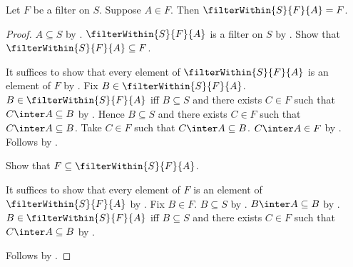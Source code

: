 \begin{proposition}\label{filter_within_eventual_set}
    Let $F$ be a filter on $S$.
    Suppose $A\in F$.
    Then $\filterWithin{S}{F}{A}=F$.
\end{proposition}
\begin{proof}
    $A\subseteq S$ by .
    $\filterWithin{S}{F}{A}$ is a filter on $S$ by
        .
    Show that $\filterWithin{S}{F}{A}\subseteq F$.
    \begin{subproof}
        It suffices to show that every element of
            $\filterWithin{S}{F}{A}$ is an element of $F$ by
            .
        Fix $B\in\filterWithin{S}{F}{A}$.
        $B\in\filterWithin{S}{F}{A}$ iff
            $B\subseteq S$ and there exists $C\in F$ such that
            $C\inter A\subseteq B$ by .
        Hence $B\subseteq S$ and there exists $C\in F$ such that
            $C\inter A\subseteq B$.
        Take $C\in F$ such that $C\inter A\subseteq B$.
        $C\inter A\in F$ by .
        Follows by .
    \end{subproof}
    Show that $F\subseteq\filterWithin{S}{F}{A}$.
    \begin{subproof}
        It suffices to show that every element of $F$ is an element of
            $\filterWithin{S}{F}{A}$ by .
        Fix $B\in F$.
        $B\subseteq S$ by .
        $B\inter A\subseteq B$ by .
        $B\in\filterWithin{S}{F}{A}$ iff
            $B\subseteq S$ and there exists $C\in F$ such that
            $C\inter A\subseteq B$ by .
    \end{subproof}
    Follows by .
\end{proof}

